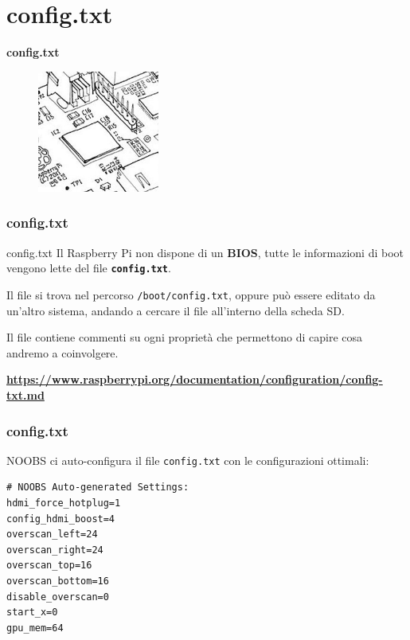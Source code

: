 \documentclass[xcolor=svgnames,11pt]{beamer}
\begin{document}
\section{config.txt}
\begin{frame}{}
\begin{center}
\begin{Huge}
{\color{green_raspi} \textbf{config.txt}}
\end{Huge}
\medskip
\begin{figure}
\includegraphics[height=4cm]{meme3.jpg}
\end{figure}
\end{center}
\end{frame}

\begin{frame}\frametitle{config.txt}

\begin{block}{config.txt}
Il Raspberry Pi non dispone di un \textbf{BIOS}, tutte le informazioni di boot vengono lette del file \texttt{\textbf{config.txt}}.
\end{block}
\medskip
\pause

Il file si trova nel percorso \texttt{/boot/config.txt}, oppure pu\`o essere editato da un'altro sistema, andando a cercare il file all'interno della scheda SD.

\medskip

Il file contiene commenti su ogni propriet\`a che permettono di capire cosa andremo a coinvolgere.

\medskip
\pause
\begin{block}{}
\begin{small}
\textbf{\url{https://www.raspberrypi.org/documentation/configuration/config-txt.md}  }
\end{small}
\end{block}
\end{frame}

\begin{frame}[fragile]\frametitle{config.txt}
NOOBS ci auto-configura il file \texttt{config.txt} con le configurazioni ottimali:

\medskip
\pause
\begin{verbatim}
# NOOBS Auto-generated Settings:
hdmi_force_hotplug=1
config_hdmi_boost=4
overscan_left=24
overscan_right=24
overscan_top=16
overscan_bottom=16
disable_overscan=0
start_x=0
gpu_mem=64
\end{verbatim}
\end{frame}
\end{document}
